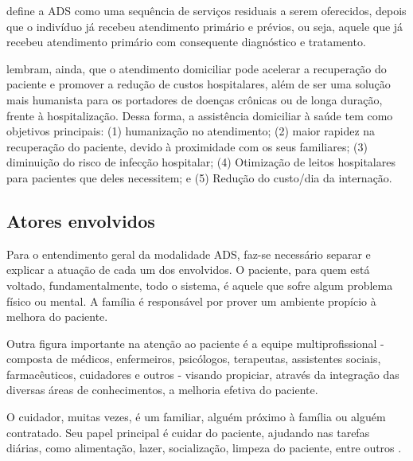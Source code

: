  define a ADS como uma sequência de serviços
residuais a serem oferecidos, depois que o indivíduo já recebeu atendimento
primário e prévios, ou seja, aquele que já recebeu atendimento primário com
consequente diagnóstico e tratamento.

 lembram, ainda, que o atendimento domiciliar
pode acelerar a recuperação do  paciente e promover a redução de custos
hospitalares, além de ser uma solução mais  humanista para os portadores de
doenças crônicas ou de longa duração, frente à  hospitalização. Dessa forma, a
assistência domiciliar à saúde tem como objetivos principais: (1) humanização
no atendimento; (2) maior rapidez na recuperação do paciente, devido à
proximidade com os seus familiares; (3) diminuição do risco de infecção
hospitalar; (4) Otimização de leitos hospitalares para pacientes que deles
necessitem; e (5) Redução do custo/dia da internação.

\subsection{Atores envolvidos}\label{subsec:envolvidos}

Para o entendimento geral da modalidade ADS, faz-se necessário separar e
explicar a atuação de cada um dos envolvidos. O paciente, para quem está
voltado, fundamentalmente, todo o sistema, é aquele que sofre algum problema
físico ou mental. A família é responsável por prover um ambiente propício à
melhora do paciente.

Outra figura importante na atenção ao paciente é a equipe multiprofissional -
composta de médicos, enfermeiros, psicólogos, terapeutas, assistentes sociais,
farmacêuticos, cuidadores e outros - visando propiciar, através da integração
das diversas áreas de conhecimentos, a melhoria efetiva do paciente.

O cuidador, muitas vezes, é um familiar, alguém próximo à família ou alguém
contratado. Seu papel principal é cuidar do paciente, ajudando nas tarefas
diárias, como alimentação, lazer, socialização, limpeza do paciente, entre
outros \cite{amaral2001assistencia}.


